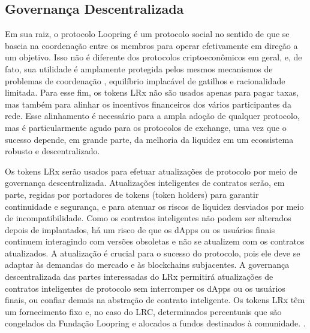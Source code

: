 \documentclass[UTF8,nofonts]{article}
\begin{document}
\begin{multicols}{2}
\subsection{Governança Descentralizada}
Em sua raiz, o protocolo Loopring é um protocolo social no sentido de que se baseia na coordenação entre os membros para operar efetivamente em direção a um objetivo. Isso não é diferente dos protocolos criptoeconômicos em geral, e, de fato, sua utilidade é amplamente protegida pelos mesmos mecanismos de problemas de coordenação \cite{vitalikgovernance}, equilíbrio implacável de gatilhos e racionalidade limitada. Para esse fim, os tokens LRx não são usados apenas para pagar taxas, mas também para alinhar os incentivos financeiros dos vários participantes da rede. Esse alinhamento é necessário para a ampla adoção de qualquer protocolo, mas é particularmente agudo para os protocolos de exchange, uma vez que o sucesso depende, em grande parte, da melhoria da liquidez em um ecossistema robusto e descentralizado.

Os tokens LRx serão usados para efetuar atualizações de protocolo por meio de governança descentralizada. Atualizações inteligentes de contratos serão, em parte, regidas por portadores de tokens (token holders) para garantir continuidade e segurança, e para atenuar os riscos de liquidez desviados por meio de incompatibilidade. Como os contratos inteligentes não podem ser alterados depois de implantados, há um risco de que os dApps ou os usuários finais continuem interagindo com versões obsoletas e não se atualizem com os contratos atualizados. A atualização é crucial para o sucesso do protocolo, pois ele deve se adaptar às demandas do mercado e às blockchains subjacentes. A governança descentralizada das partes interessadas do LRx permitirá atualizações de contratos inteligentes de protocolo sem interromper os dApps ou os usuários finais, ou confiar demais na abstração de contrato inteligente. Os tokens LRx têm um fornecimento fixo e, no caso do LRC, determinados percentuais que são congelados da Fundação Loopring e alocados a fundos destinados à comunidade. \cite{LRCtokendoc}.


\end{multicols}
\end{document}
